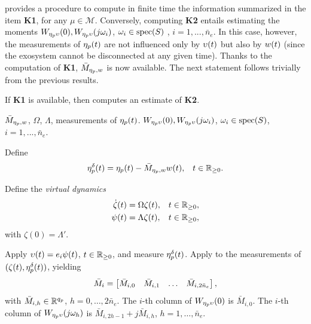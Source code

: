  provides a procedure to compute in finite time the information summarized in the item \textbf{K1}, for any $\mu\in\mathcal{M}$. Conversely, computing \textbf{K2} entails estimating the moments $W_{\eta_p\upsilon}(0), W_{\eta_p\upsilon}(j \omega_i)$, $\omega_i\in\operatorname{spec}(S)$ , $i = 1, ..., \bar{n}_e$. In this case, however, the measurements of $\eta_p(t)$ are not influenced only by $\upsilon(t)$ but also by $w(t)$ (since the exosystem cannot be disconnected at any given time). Thanks to the computation of \textbf{K1}, $\bar{M}_{\eta_p,w}$ is now available. The next statement follows trivially from the previous results.
\begin{lemma}
  \label{lem:ddall_algoK2}
  If \textbf{K1} is available, then  computes an estimate of \textbf{K2}.\closestatement
\end{lemma}

\begin{algorithm}[h!]
  \caption{Data-driven computation of \textbf{K2}.}
  \label{alg:ddall_algoK2}
  \begin{algorithmic}[1]
    \Require $\bar{M}_{\eta_p,w}$, $\Omega$, $\Lambda$, measurements of $\eta_p(t)$.
    \Ensure $W_{\eta_p\upsilon}(0), W_{\eta_p\upsilon}(j \omega_i)$, $\omega_i\in\operatorname{spec}(S)$, $i = 1, ..., \bar{n}_e$.

    \State Define
    \Statex
      \begin{align}
        \eta_p^{\delta}(t) &= \eta_p(t) - \bar{M}_{\eta_p,w}w(t), & t\in\mathbb{R}_{\geq 0}.
      \end{align}

    \State Define the \emph{virtual dynamics}
    \Statex
      \begin{subequations}
        \label{eq:ddall_virtual_exo}
        \begin{align}
          \dot{\zeta}(t) &= \Omega\zeta(t), & t\in\mathbb{R}_{\geq 0}, \\
          \psi(t) &= \Lambda\zeta(t), & t\in\mathbb{R}_{\geq 0},
        \end{align}
      \end{subequations}
    \Statex with $\zeta(0)=\Lambda'$.

      \State Apply $\upsilon(t)=e_i\psi(t)$, $t\in\mathbb{R}_{\geq 0}$, and measure $\eta_p^{\delta}(t)$.
      \State Apply  to the measurements of $(\zeta(t),\eta_p^{\delta}(t))$, yielding
      \Statex
        \begin{align}
          \bar{M}_{i} = \begin{bmatrix}\bar{M}_{i,0} & \bar{M}_{i,1} & \ldots & \bar{M}_{i, 2 \bar{n}_e}\end{bmatrix},
        \end{align}
      \Statex \hspace{.5cm}with $\bar{M}_{i,h} \in \mathbb{R}^{{q_p}}$, $h=0,\dotsc,2\bar{n}_e$.
      \State The $i$-th column of $W_{\eta_p\upsilon}(0)$ is $\bar{M}_{i,0}$.
      \State The $i$-th column of $W_{\eta_p\upsilon}(j\omega_h)$ is $\bar{M}_{i,2h-1} + j\bar{M}_{i,h}$, $h=1,\dotsc,\bar{n}_e$.
    \EndFor
  \end{algorithmic}
\end{algorithm}

